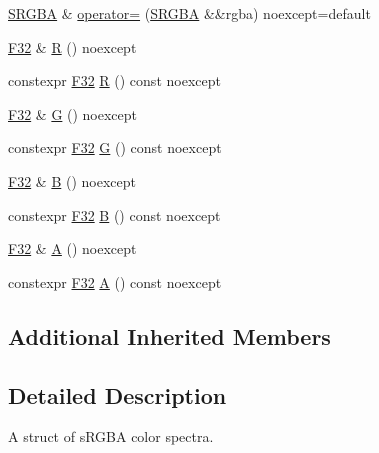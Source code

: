 \begin{DoxyCompactItemize}
\item 
\mbox{\hyperlink{structmage_1_1_s_r_g_b_a}{S\+R\+G\+BA}} \& \mbox{\hyperlink{structmage_1_1_s_r_g_b_a_a0f7080a5fc080f5e3463ca95bb21918c}{operator=}} (\mbox{\hyperlink{structmage_1_1_s_r_g_b_a}{S\+R\+G\+BA}} \&\&rgba) noexcept=default
\item 
\mbox{\hyperlink{namespacemage_aa97e833b45f06d60a0a9c4fc22ae02c0}{F32}} \& \mbox{\hyperlink{structmage_1_1_s_r_g_b_a_a45310787ec16705f026cdcee58e1f783}{R}} () noexcept
\item 
constexpr \mbox{\hyperlink{namespacemage_aa97e833b45f06d60a0a9c4fc22ae02c0}{F32}} \mbox{\hyperlink{structmage_1_1_s_r_g_b_a_a0b291da740acf9f6b79c0faf5bbf3f10}{R}} () const noexcept
\item 
\mbox{\hyperlink{namespacemage_aa97e833b45f06d60a0a9c4fc22ae02c0}{F32}} \& \mbox{\hyperlink{structmage_1_1_s_r_g_b_a_a2ad28d716342f58267297875a696f8e5}{G}} () noexcept
\item 
constexpr \mbox{\hyperlink{namespacemage_aa97e833b45f06d60a0a9c4fc22ae02c0}{F32}} \mbox{\hyperlink{structmage_1_1_s_r_g_b_a_a1601a73d4e73c2d5dfe0281b050533a6}{G}} () const noexcept
\item 
\mbox{\hyperlink{namespacemage_aa97e833b45f06d60a0a9c4fc22ae02c0}{F32}} \& \mbox{\hyperlink{structmage_1_1_s_r_g_b_a_a80ac37642fa66c167f34fa6fc6792f11}{B}} () noexcept
\item 
constexpr \mbox{\hyperlink{namespacemage_aa97e833b45f06d60a0a9c4fc22ae02c0}{F32}} \mbox{\hyperlink{structmage_1_1_s_r_g_b_a_a8d69a7e851ff5ba5fb35a80d62ffc3c4}{B}} () const noexcept
\item 
\mbox{\hyperlink{namespacemage_aa97e833b45f06d60a0a9c4fc22ae02c0}{F32}} \& \mbox{\hyperlink{structmage_1_1_s_r_g_b_a_abff0df62d9543624b2d1617f643c6e05}{A}} () noexcept
\item 
constexpr \mbox{\hyperlink{namespacemage_aa97e833b45f06d60a0a9c4fc22ae02c0}{F32}} \mbox{\hyperlink{structmage_1_1_s_r_g_b_a_a49871e2ca373c6fb0eb7d21ad2e53900}{A}} () const noexcept
\end{DoxyCompactItemize}
\subsection*{Additional Inherited Members}


\subsection{Detailed Description}
A struct of s\+R\+G\+BA color spectra. 

